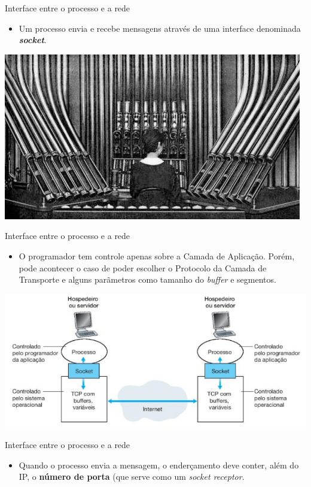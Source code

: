 \documentclass{libs/ufc_format}
\begin{document}
\begin{frame}{Interface entre o processo e a rede}
    \begin{itemize}
        \justifying
        \item Um processo envia e recebe mensagens através de uma interface denominada \textbf{\textit{socket}}.
    \end{itemize}
    \centering
    \includegraphics[scale = 0.5]{figuras/figura02_02_01}
\end{frame}

\begin{frame}{Interface entre o processo e a rede}
    \begin{itemize}
        \justifying
        \item O programador tem controle apenas sobre a Camada de Aplicação. Porém, pode acontecer o caso de poder escolher o Protocolo da Camada de Transporte e alguns parãmetros como tamanho do \textit{buffer} e segmentos.
    \end{itemize}
    \includegraphics[scale = 0.75]{figuras/figura02_03}
\end{frame}

\begin{frame}{Interface entre o processo e a rede}
    \begin{itemize}
        \justifying
        \item Quando o processo envia a mensagem, o enderçamento deve conter, além do IP, o \textbf{número de porta} (que serve como um \textit{socket receptor}.
    \end{itemize}
\end{frame}
\end{document}
